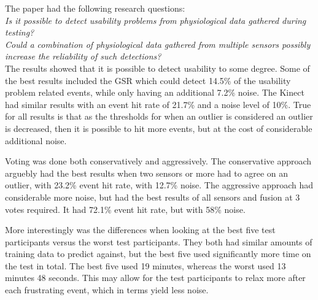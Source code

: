 The paper had the following research questions:\\

\textit{Is it possible to detect usability problems from physiological data gathered during testing?}\\

\textit{Could a combination of physiological data gathered from multiple sensors possibly increase the reliability of such detections?}\\

The results showed that it is possible to detect usability to some degree. 
Some of the best results included the GSR which could detect 14.5\% of the usability problem related events, while only having an additional 7.2\% noise. 
The Kinect had similar results with an event hit rate of 21.7\% and a noise level of 10\%. 
True for all results is that as the thresholds for when an outlier is considered an outlier is decreased, then it is possible to hit more events, but at the cost of considerable additional noise.

Voting was done both conservatively and aggressively.
The conservative approach arguebly had the best results when two sensors or more had to agree on an outlier, with 23.2\% event hit rate, with 12.7\% noise.
The aggressive approach had considerable more noise, but had the best results of all sensors and fusion at 3 votes required.
It had 72.1\% event hit rate, but with 58\% noise.

More interestingly was the differences when looking at the best five test participants versus the worst test participants. 
They both had similar amounts of training data to predict against, but the best five used significantly more time on the test in total.
The best five used 19 minutes, whereas the worst used 13 minutes 48 seconds. 
This may allow for the test participants to relax more after each frustrating event, which in terms yield less noise. 
